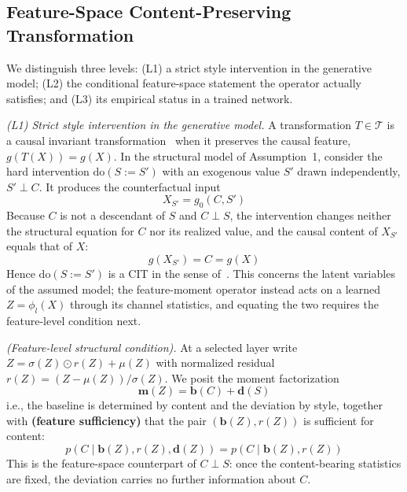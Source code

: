 \documentclass[electronics,article,submit,moreauthors]{Definitions/mdpi}
\begin{document}
\subsection{Feature-Space Content-Preserving Transformation}

We distinguish three levels: (L1) a strict style intervention in the generative model; (L2) the conditional feature-space statement the operator actually satisfies; and (L3) its empirical status in a trained network.

\noindent\textit{(L1) Strict style intervention in the generative model.} A transformation $T\in\mathcal{T}$ is a causal invariant transformation~\citep{ref22} when it preserves the causal feature, $g(T(X))=g(X)$. In the structural model of Assumption~1, consider the hard intervention $\mathrm{do}(S\!:=\!S')$ with an exogenous value $S'$ drawn independently, $S'\perp C$. It produces the counterfactual input
\begin{equation}
X_{S'}=g_0(C,S')
\end{equation}
Because $C$ is not a descendant of $S$ and $C\perp S$, the intervention changes neither the structural equation for $C$ nor its realized value, and the causal content of $X_{S'}$ equals that of $X$:
\begin{equation}
g(X_{S'})=C=g(X)
\end{equation}
Hence $\mathrm{do}(S\!:=\!S')$ is a CIT in the sense of~\citep{ref22}. This concerns the latent variables of the assumed model; the feature-moment operator instead acts on a learned $Z=\phi_l(X)$ through its channel statistics, and equating the two requires the feature-level condition next.

\noindent\textit{(Feature-level structural condition).} At a selected layer write $Z=\sigma(Z)\odot r(Z)+\mu(Z)$ with normalized residual $r(Z)=(Z-\mu(Z))/\sigma(Z)$. We posit the moment factorization
\begin{equation}
\mathbf{m}(Z)=\mathbf{b}(C)+\mathbf{d}(S)
\end{equation}
i.e., the baseline is determined by content and the deviation by style, together with \textbf{(feature sufficiency)} that the pair $(\mathbf{b}(Z),r(Z))$ is sufficient for content:
\begin{equation}
p\!\left(C\mid \mathbf{b}(Z),r(Z),\mathbf{d}(Z)\right)=p\!\left(C\mid \mathbf{b}(Z),r(Z)\right)
\end{equation}
This is the feature-space counterpart of $C\perp S$: once the content-bearing statistics are fixed, the deviation carries no further information about $C$.
\end{document}
